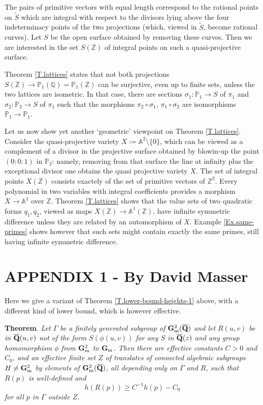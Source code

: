 \documentclass[leqno,12pt]{article} %
\def\A{{{\mathbb A}}}
\def\Z{{{\mathbb Z}}}
\def\Q{{{\mathbb Q}}}
\def\P{{{\mathbb P}}}
\theoremstyle{plain} %
\theoremstyle{definition} %
\begin{document}
The pairs of primitive vectors with equal length correspond to the rational points on $\tilde{S}$ which are integral with respect to the divisors lying above the four indeterminacy points of the two projections (which, viewed in $\tilde{S}$, become rational curves). Let $S$ be the open surface obtained by removing these curves. Then we are interested in the set $S(\Z)$ of integral points on such a quasi-projective surface.

Theorem \ref{T.lattices}  states that not both projections $S(\Z)\to \P_1(\Q)=\P_1(\Z)$ can be surjective, even up to finite sets, unless the two lattices are isometric. In that case, there are sections $\sigma_1:\P_1\to S$ of $\pi_1$ and   $\sigma_2:\P_2\to S$ of $\pi_1$ such that the morphisms $\pi_2\circ\sigma_1$, $\pi_1\circ \sigma_2$ are isomorphisms $\P_1\to\P_1$.

\medskip

Let us now show yet another `geometric' viewpoint on Theorem \ref{T.lattices}. Consider the quasi-projective variety $X:=\A^2\setminus\{0\}$, which can be viewed as a complement of a divisor in the projective surface obtained by blowin-up the point $(0:0:1)$ in $\P_2$: namely, removing from that surface the  line at infinity plus the exceptional divisor one obtains the quasi projective variety $X$. The set of integral points $X(\Z)$ consists exactely  of the set of primitive vectors of $\Z^2$. Every polynomial in two variables with integral coefficients provides a morphism $X\to \A^1$ over $\Z$. Theorem \ref{T.lattices} shows that the value sets of two quadratic forms $q_1,q_2$, viewed as maps $X(\Z)\to \A^1(\Z)$, have infinite symmetric difference unless they are related by an automorphism of $X$.
 Example \ref{Ex.same-primes} shows  however that such sets might contain exactly the same primes,  still having infinite symmetric difference.

\smallskip

\bigskip



\section*{APPENDIX 1 - By David Masser}

Here we give a variant of Theorem \ref{T.lower-bound-heights-1} above, with a different kind of lower bound, which is however effective.

\bigskip
\noindent
{\bf Theorem}. {\it Let $\Gamma$ be a finitely generated subgroup of ${\bf G}_{\rm m}^2(\overline{\bf Q})$ and let $R(u,v)$ be in $\overline{\bf Q}(u,v)$ not of the form $S(\phi(u,v))$ for any $S$ in $\overline{\bf Q}(z)$ and any group homomorphism $\phi$ from ${\bf G}_{\rm m}^2$ to ${\bf G}_{\rm m}$. Then there are effective constants $C > 0$ and $C_0$, and an effective finite set $Z$ of
translates of connected algebraic subgroups $H \neq {\bf G}_{\rm m}^2$ by elements of ${\bf G}_{\rm m}^2(\overline{\bf Q})$, all depending only on $\Gamma$ and $R$, such that $R(p)$ is well-defined and
$$h(R(p)) \geq C^{-1}h(p)-C_0$$
for all $p$ in $\Gamma$ outside $Z$.}
\bigskip
\end{document}
